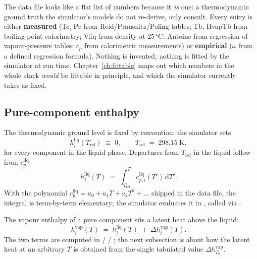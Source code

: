 \documentclass[11pt,a4paper]{article}
\begin{document}
\begin{intuition}
The data file looks like a flat list of numbers because it
\emph{is} one: a thermodynamic ground truth the simulator's models
do not re-derive, only consult.  Every entry is either
\textbf{measured} (Tc, Pc from Reid/Prausnitz/Poling tables;
Tb, HvapTb from boiling-point calorimetry; Vliq from density at
$25\,^\circ$C; Antoine from regression of vapour-pressure tables;
$c_p$ from calorimetric measurements) or \textbf{empirical}
($\omega$ from a defined regression formula).  Nothing is invented;
nothing is fitted by the simulator at run time.  Chapter~\ref{ch:fittable}
maps out which numbers in the whole stack \emph{would} be fittable in
principle, and which the simulator currently takes as fixed.
\end{intuition}

\subsection{Pure-component enthalpy}

The thermodynamic ground level is fixed by convention: the simulator
sets
\begin{equation}
   h^{\mathrm{liq}}_i(T_{\mathrm{ref}}) \;\equiv\; 0,
   \qquad T_{\mathrm{ref}} \;=\; 298.15~\mathrm{K},
   \label{eq:integral-href}
\end{equation}
for every component in the liquid phase.  Departures from $T_{\mathrm{ref}}$
in the liquid follow from $c_p^{\mathrm{liq}}$:
\begin{equation}
   h^{\mathrm{liq}}_i(T) \;=\; \int_{T_{\mathrm{ref}}}^{T} c_{p,i}^{\mathrm{liq}}(T')\,\mathrm{d}T'.
\end{equation}
With the polynomial $c_p^{\mathrm{liq}} = a_0 + a_1 T + a_2 T^2 + \dots$
shipped in the data file, the integral is term-by-term elementary;
the simulator evaluates it in ,
called via .

The vapour enthalpy of a pure component sits a latent heat above the
liquid:
\begin{equation}
   \boxed{\;
   h^{\mathrm{vap}}_i(T) \;=\; h^{\mathrm{liq}}_i(T) \;+\; \Delta h^{\mathrm{vap}}_i(T).
   \;}
   \label{eq:integral-hvap}
\end{equation}
The two terms are computed in
 /  /
; the next subsection is about how the
latent heat at an arbitrary $T$ is obtained from the single tabulated
value $\Delta h^{\mathrm{vap}}_{T_b}$.
\end{document}
